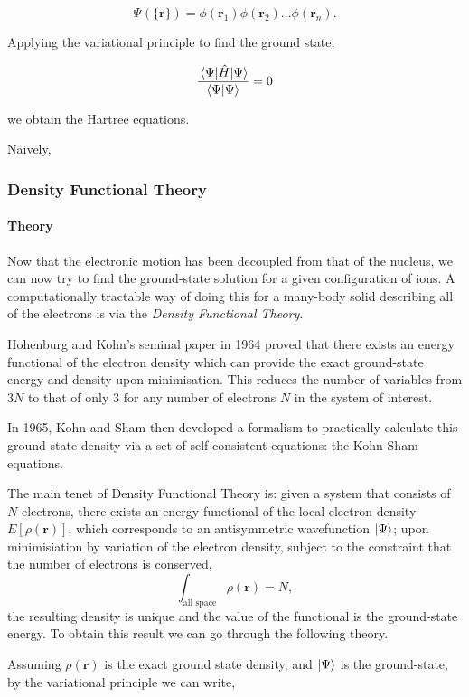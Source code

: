 \documentclass[a4paper,11pt]{article}
\numberwithin{equation}{chapter}
\numberwithin{listing}{chapter}
\begin{document}
\[ \Psi_{}(\{\mathbf{r}\}) = \phi(\mathbf{r}_1)\phi(\mathbf{r}_2)\ldots \phi(\mathbf{r}_n). \]

Applying the variational principle to find the ground state,

\[ \frac{ \expval{ \hat{H} }{ \Psi }}{ \bra{\Psi}\ket{\Psi} } = 0 \]

we obtain the Hartree equations. 



Näively,

\subsubsection{Density Functional Theory}
\label{sec:orgf03b192}

\paragraph{Theory}
\label{sec:org94baf7d}

Now that the electronic motion has been decoupled from that of the nucleus, we can now try to
find the ground-state solution for a given configuration of ions. A computationally tractable
way of doing this for a many-body solid describing all of the electrons is via the \emph{Density
Functional Theory}. 

Hohenburg and Kohn's seminal paper in 1964 proved that there exists an energy functional of the
electron density which can provide the exact ground-state energy and density upon
minimisation. This reduces the number of variables from \(3N\) to that of only 3 for any number
of electrons \(N\) in the system of interest.

In 1965, Kohn and Sham then developed a formalism to practically calculate this ground-state density via
a set of self-consistent equations: the Kohn-Sham equations. 

The main tenet of Density Functional Theory is: given a system that consists of \(N\) electrons,
there exists an energy functional of the local electron density \(E[\rho(\mathbf{r})]\), which
corresponds to an antisymmetric wavefunction \(\ket{\Psi}\); upon minimisiation by
variation of the electron density, subject to the constraint that the number of electrons is
conserved, \[ \int_{\text{all space}} \rho(\mathbf{r}) = N, \] the resulting density is unique
and the value of the functional is the ground-state energy. To obtain this result we can go
through the following theory.

Assuming \(\rho(\mathbf{r})\) is the exact ground state density, and \(\ket{\Psi}\)
is the ground-state, by the variational principle we can write, 
\end{document}
